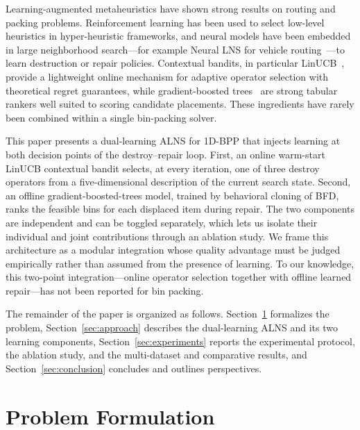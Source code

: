 \documentclass[conference]{IEEEtran}
\begin{document}
Learning-augmented metaheuristics have shown strong results on routing and
packing problems. Reinforcement learning has been used to select low-level
heuristics in hyper-heuristic frameworks, and neural models have been embedded in
large neighborhood search---for example Neural LNS for vehicle
routing~\cite{bHottung}---to learn destruction or repair policies. Contextual
bandits, in particular LinUCB~\cite{bLi,bChu}, provide a lightweight online
mechanism for adaptive operator selection with theoretical regret guarantees,
while gradient-boosted trees~\cite{bFriedman} are strong tabular rankers
well suited to scoring candidate placements. These ingredients have rarely been
combined within a single bin-packing solver.

This paper presents a dual-learning ALNS for 1D-BPP that injects learning at both
decision points of the destroy--repair loop. First, an online warm-start LinUCB
contextual bandit selects, at every iteration, one of three destroy operators
from a five-dimensional description of the current search state. Second, an
offline gradient-boosted-trees model, trained by behavioral cloning of BFD, ranks
the feasible bins for each displaced item during repair. The two components are
independent and can be toggled separately, which lets us isolate their individual
and joint contributions through an ablation study. We frame this architecture as
a modular integration whose quality advantage must be judged empirically rather
than assumed from the presence of learning. To our knowledge, this two-point
integration---online operator selection together with offline learned repair---has
not been reported for bin packing.

The remainder of the paper is organized as follows.
Section~\ref{sec:formulation} formalizes the problem,
Section~\ref{sec:approach} describes the dual-learning ALNS and its two learning
components, Section~\ref{sec:experiments} reports the experimental protocol, the
ablation study, and the multi-dataset and comparative results, and
Section~\ref{sec:conclusion} concludes and outlines perspectives.

\section{Problem Formulation}\label{sec:formulation}
\end{document}
